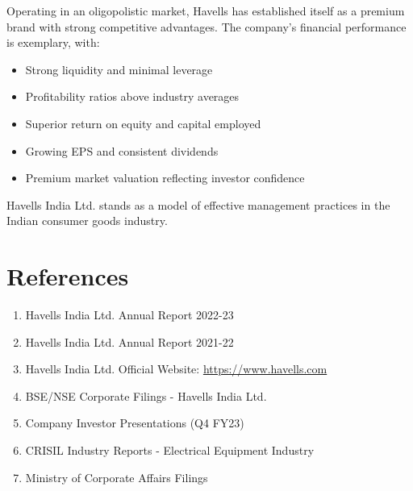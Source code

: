 \documentclass[12pt,a4paper]{article}
\begin{document}
Operating in an oligopolistic market, Havells has established itself as a premium brand with strong competitive advantages. The company's financial performance is exemplary, with:
\begin{itemize}
    \item Strong liquidity and minimal leverage
    \item Profitability ratios above industry averages
    \item Superior return on equity and capital employed
    \item Growing EPS and consistent dividends
    \item Premium market valuation reflecting investor confidence
\end{itemize}

Havells India Ltd. stands as a model of effective management practices in the Indian consumer goods industry.

\newpage
\section{References}

\begin{enumerate}[leftmargin=*]
    \item Havells India Ltd. Annual Report 2022-23
    \item Havells India Ltd. Annual Report 2021-22
    \item Havells India Ltd. Official Website: \url{https://www.havells.com}
    \item BSE/NSE Corporate Filings - Havells India Ltd.
    \item Company Investor Presentations (Q4 FY23)
    \item CRISIL Industry Reports - Electrical Equipment Industry
    \item Ministry of Corporate Affairs Filings
\end{enumerate}

\end{document}
